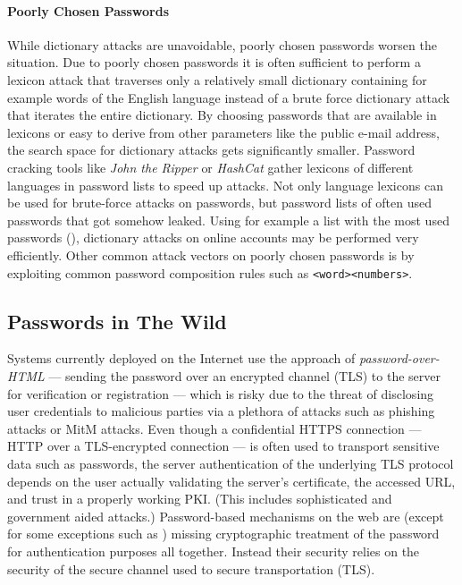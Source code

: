\paragraph{Poorly Chosen Passwords}
While dictionary attacks are unavoidable, poorly chosen passwords worsen the situation.
Due to poorly chosen passwords it is often sufficient to perform a lexicon attack that traverses only a relatively small dictionary containing for example words of the English language instead of a brute force dictionary attack that iterates the entire dictionary.
By choosing passwords that are available in lexicons or easy to derive from other parameters like the public e-mail address, the search space for dictionary attacks gets significantly smaller.
Password cracking tools like \emph{John the Ripper} \cite{JohnTheRipper} or \emph{HashCat} \cite{hashcat} gather lexicons of different languages in password lists \cite{JohnTheRipperWordlist} to speed up attacks.
Not only language lexicons can be used for brute-force attacks on passwords, but password lists of often used passwords that got somehow leaked.
Using for example a list with the most used passwords (\eg \cite{XatoPwds,XatoPwds2,skullSecurity}), dictionary attacks on online accounts may be performed very efficiently.
Other common attack vectors on poorly chosen passwords is by exploiting common password composition rules such as \verb+<word><numbers>+.


\subsection{Passwords in The Wild}
Systems currently deployed on the Internet use the approach of \emph{password-over-\acs{HTML}} --- sending the password over an encrypted channel (\ac{TLS}) to the server for verification or registration --- which is risky due to the threat of disclosing user credentials to malicious parties via a plethora of attacks such as phishing attacks or \ac{MitM} attacks.
Even though a confidential \ac{HTTPS} connection --- \ac{HTTP} over a \ac{TLS}-encrypted connection --- is often used to transport sensitive data such as passwords, the server authentication of the underlying \ac{TLS} protocol depends on the user actually validating the server's certificate, the accessed \ac{URL}, and trust in a properly working \ac{PKI}.
(This includes sophisticated and government aided attacks.)
Password-based mechanisms on the web are (except for some exceptions such as \cite{FirefoxSync}) missing cryptographic treatment of the password for authentication purposes all together.
Instead their security relies on the security of the secure channel used to secure transportation (\ac{TLS}).

